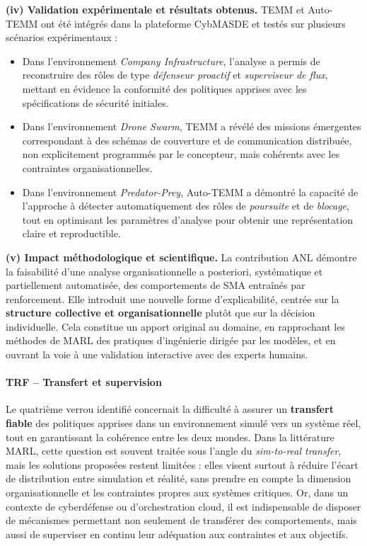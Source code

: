 \medskip
\noindent
\textbf{(iv) Validation expérimentale et résultats obtenus.}
TEMM et Auto-TEMM ont été intégrés dans la plateforme \ac{CybMASDE} et testés sur plusieurs scénarios expérimentaux :
\begin{itemize}
  \item Dans l’environnement \textit{Company Infrastructure}, l’analyse a permis de reconstruire des rôles de type \textit{défenseur proactif} et \textit{superviseur de flux}, mettant en évidence la conformité des politiques apprises avec les spécifications de sécurité initiales.
  \item Dans l’environnement \textit{Drone Swarm}, TEMM a révélé des missions émergentes correspondant à des schémas de couverture et de communication distribuée, non explicitement programmés par le concepteur, mais cohérents avec les contraintes organisationnelles.
  \item Dans l’environnement \textit{Predator-Prey}, Auto-TEMM a démontré la capacité de l’approche à détecter automatiquement des rôles de \textit{poursuite} et de \textit{blocage}, tout en optimisant les paramètres d’analyse pour obtenir une représentation claire et reproductible.
\end{itemize}

\medskip
\noindent
\textbf{(v) Impact méthodologique et scientifique.}
La contribution ANL démontre la faisabilité d’une analyse organisationnelle a posteriori, systématique et partiellement automatisée, des comportements de SMA entraînés par renforcement.
Elle introduit une nouvelle forme d’explicabilité, centrée sur la \textbf{structure collective et organisationnelle} plutôt que sur la décision individuelle.
Cela constitue un apport original au domaine, en rapprochant les méthodes de \ac{MARL} des pratiques d’ingénierie dirigée par les modèles, et en ouvrant la voie à une validation interactive avec des experts humains.

\paragraph{TRF – Transfert et supervision}

Le quatrième verrou identifié concernait la difficulté à assurer un \textbf{transfert fiable} des politiques apprises dans un environnement simulé vers un système réel, tout en garantissant la cohérence entre les deux mondes.
Dans la littérature \ac{MARL}, cette question est souvent traitée sous l’angle du \textit{sim-to-real transfer}, mais les solutions proposées restent limitées :
elles visent surtout à réduire l’écart de distribution entre simulation et réalité, sans prendre en compte la dimension organisationnelle et les contraintes propres aux systèmes critiques.
Or, dans un contexte de cyberdéfense ou d’orchestration cloud, il est indispensable de disposer de mécanismes permettant non seulement de transférer des comportements, mais aussi de superviser en continu leur adéquation aux contraintes et aux objectifs.

